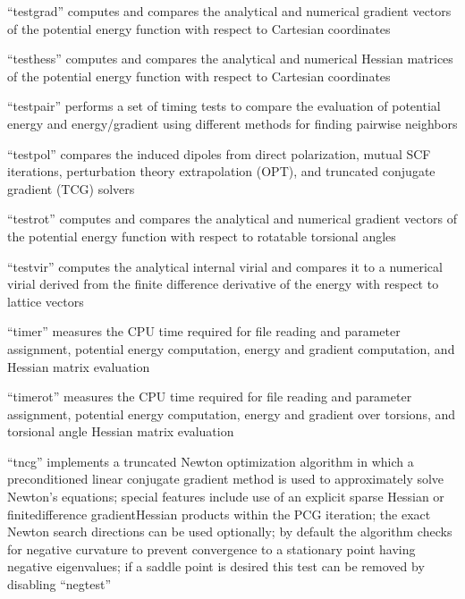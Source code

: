 \documentclass[letterpaper,11pt,english]{sphinxmanual}
\begin{document}
“testgrad” computes and compares the analytical and numerical
gradient vectors of the potential energy function with respect
to Cartesian coordinates


“testhess” computes and compares the analytical and numerical
Hessian matrices of the potential energy function with respect
to Cartesian coordinates


“testpair” performs a set of timing tests to compare the
evaluation of potential energy and energy/gradient using
different methods for finding pairwise neighbors


“testpol” compares the induced dipoles from direct polarization,
mutual SCF iterations, perturbation theory extrapolation (OPT),
and truncated conjugate gradient (TCG) solvers


“testrot” computes and compares the analytical and numerical
gradient vectors of the potential energy function with respect
to rotatable torsional angles


“testvir” computes the analytical internal virial and compares
it to a numerical virial derived from the finite difference
derivative of the energy with respect to lattice vectors


“timer” measures the CPU time required for file reading and
parameter assignment, potential energy computation, energy
and gradient computation, and Hessian matrix evaluation


“timerot” measures the CPU time required for file reading
and parameter assignment, potential energy computation,
energy and gradient over torsions, and torsional angle
Hessian matrix evaluation


“tncg” implements a truncated Newton optimization algorithm
in which a preconditioned linear conjugate gradient method is
used to approximately solve Newton’s equations; special features
include use of an explicit sparse Hessian or finite\sphinxhyphen{}difference
gradient\sphinxhyphen{}Hessian products within the PCG iteration; the exact
Newton search directions can be used optionally; by default the
algorithm checks for negative curvature to prevent convergence
to a stationary point having negative eigenvalues; if a saddle
point is desired this test can be removed by disabling “negtest”
\end{document}
